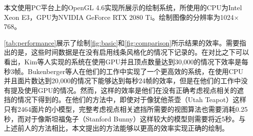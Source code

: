 本文使用PC平台上的OpenGL 4.6实现所展示的\stc{}\vdl{}绘制系统，所使用的CPU为Intel Xeon E3，GPU为NVIDIA GeForce RTX 2080 Ti。绘制图像的分辨率为1024$\times$768。

\autoref{tab:performance}展示了绘制\autoref{fig:basic}和\autoref{fig:comparison}所示结果的效率。需要指出的是，这些时间数据是在没有启用线条风格化的情况下记录的。在对比之下可以看出，Kim等人实现的系统\cite{kim2013stereoscopic}在使用GPU并且顶点数量达到30,000的情况下效率是每秒3帧。Bukenberger等人在他们的工作中实现了一个更高效的系统\cite{bukenberger2018stereo}，在使用CPU并且面片数达到20,000的情况下能够达到每秒24帧的效率，但是在他们的工作中没有提及使用GPU的情况。然而，这样的效率是他们在没有正确考虑视点相关的遮挡的情况下得到的。在他们的方法中，即使对于像犹他茶壶（Utah Teapot）这样只有2464面片的小模型，完整考虑视点相关遮挡所需要的视图算法也需要消耗0.25秒，而对于像斯坦福兔子（Stanford Bunny）这样较大的模型则需要将近5秒。与上述前人的方法相比，本文提出的方法能够以更高的效率实现正确的\stc{}\vdl{}绘制。